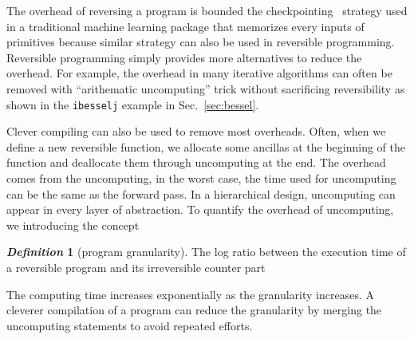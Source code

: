 \documentclass[aps,twocolumn,longbibliography,english,superscriptaddress]{revtex4-1}
\newcommand{\<}{\langle}
\renewcommand{\>}{\rangle}
\newcommand{\Sec}[1]{Sec.~\ref{#1}}
\theoremstyle{definition}\newtheorem{definition}{\textit{Definition}}
\begin{document}
The overhead of reversing a program is bounded the checkpointing~\cite{Chen2016} strategy used in a traditional machine learning package that memorizes every inputs of primitives because similar strategy can also be used in reversible programming.~\cite{Perumalla2013}
Reversible programming simply provides more alternatives to reduce the overhead.
For example, the overhead in many iterative algorithms can often be removed with ``arithematic uncomputing'' trick without sacrificing reversibility as shown in the \texttt{ibesselj} example in \Sec{sec:bessel}.

Clever compiling can also be used to remove most overheads.
Often, when we define a new reversible function, we allocate some ancillas at the beginning of the function and deallocate them through uncomputing at the end.
The overhead comes from the uncomputing, in the worst case, the time used for uncomputing can be the same as the forward pass.
In a hierarchical design, uncomputing can appear in every layer of abstraction. To quantify the overhead of uncomputing, we introducing the concept
\begin{definition}[program granularity]
    The log ratio between the execution time of a reversible program and its irreversible counter part
\end{definition}
The computing time increases exponentially as the granularity increases.
A cleverer compilation of a program can reduce the granularity by merging the uncomputing statements to avoid repeated efforts.
\end{document}
